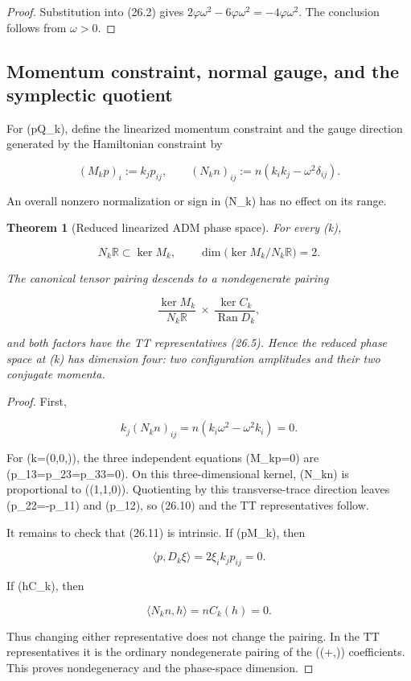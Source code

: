 \documentclass[11pt]{article}
\newtheorem{theorem}{Theorem}[section]
\theoremstyle{remark}
\begin{document}
\begin{proof}
Substitution into (26.2) gives
\(2\varphi\omega^2-6\varphi\omega^2=-4\varphi\omega^2\).
The conclusion follows from \(\omega>0\).
\end{proof}

\subsection{Momentum constraint, normal gauge, and the symplectic quotient}

For (p\in Q_k), define the linearized momentum constraint and the gauge
direction generated by the Hamiltonian constraint by

\[
 (M_kp)_i:=k_jp_{ij},
 \qquad
 (N_kn)_{ij}:=n(k_ik_j-\omega^2\delta_{ij}).                   \tag{26.9}
\]

An overall nonzero normalization or sign in (N_k) has no effect on its
range.

\begin{theorem}[Reduced linearized ADM phase space]
\label{thm:v19v23-phase}
For every (k),

\[
 N_k\mathbb R\subset\ker M_k,
 \qquad
 \dim\bigl(\ker M_k/N_k\mathbb R\bigr)=2.                    \tag{26.10}
\]

The canonical tensor pairing descends to a nondegenerate pairing

\[
 \frac{\ker M_k}{N_k\mathbb R}
 \ \times\ 
 \frac{\ker C_k}{\operatorname{Ran}D_k},                     \tag{26.11}
\]

and both factors have the TT representatives (26.5).  Hence the reduced
phase space at (k) has dimension four: two configuration amplitudes and
their two conjugate momenta.
\end{theorem}

\begin{proof}
First,

\[
 k_j(N_kn)_{ij}
 =n(k_i\omega^2-\omega^2k_i)=0.                              \tag{26.12}
\]

For (k=(0,0,\omega)), the three independent equations (M_kp=0)
are (p_{13}=p_{23}=p_{33}=0).  On this three-dimensional kernel,
(N_kn) is proportional to
((1,1,0)).  Quotienting by this transverse-trace
direction leaves (p_{22}=-p_{11}) and (p_{12}), so (26.10) and the TT
representatives follow.

It remains to check that (26.11) is intrinsic.  If (p\in\ker M_k), then

\[
 \langle p,D_k\xi\rangle=2\xi_i k_jp_{ij}=0.                  \tag{26.13}
\]

If (h\in\ker C_k), then

\[
 \langle N_kn,h\rangle=nC_k(h)=0.                            \tag{26.14}
\]

Thus changing either representative does not change the pairing.  In the
TT representatives it is the ordinary nondegenerate pairing of the
((+,\times)) coefficients.  This proves nondegeneracy and the phase-space
dimension.
\end{proof}
\end{document}
